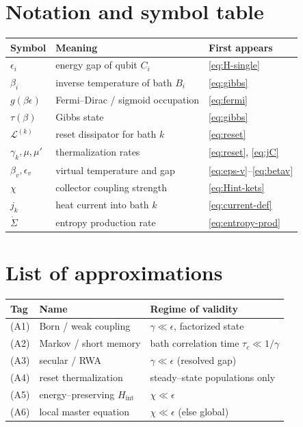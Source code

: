 \documentclass[11pt,a4paper]{article}
\newcommand{\calL}{\mathcal{L}}
\theoremstyle{definition}
\theoremstyle{remark}
\begin{document}
\section{Notation and symbol table}
\label{app:notation}
\begin{center}
\begin{tabularx}{\textwidth}{@{}llX@{}}
\toprule
Symbol & Meaning & First appears \\
\midrule
$\epsilon_i$ & energy gap of qubit $C_i$ & \eqref{eq:H-single} \\
$\beta_i$ & inverse temperature of bath $B_i$ & \eqref{eq:gibbs} \\
$g(\beta\epsilon)$ & Fermi--Dirac / sigmoid occupation & \eqref{eq:fermi} \\
$\tau(\beta)$ & Gibbs state & \eqref{eq:gibbs} \\
$\calL^{(k)}$ & reset dissipator for bath $k$ & \eqref{eq:reset} \\
$\gamma_k,\mu,\mu'$ & thermalization rates & \eqref{eq:reset}, \eqref{eq:jC} \\
$\beta_v,\epsilon_v$ & virtual temperature and gap & \eqref{eq:eps-v}--\eqref{eq:betav} \\
$\chi$ & collector coupling strength & \eqref{eq:Hint-kets} \\
$j_k$ & heat current into bath $k$ & \eqref{eq:current-def} \\
$\dot\Sigma$ & entropy production rate & \eqref{eq:entropy-prod} \\
\bottomrule
\end{tabularx}
\end{center}

\section{List of approximations}
\label{app:approx}
\begin{center}
\begin{tabularx}{\textwidth}{@{}llX@{}}
\toprule
Tag & Name & Regime of validity \\
\midrule
(A1) & Born / weak coupling & $\gamma\ll\epsilon$, factorized state \\
(A2) & Markov / short memory & bath correlation time $\tau_c\ll1/\gamma$ \\
(A3) & secular / RWA & $\gamma\ll\epsilon$ (resolved gap) \\
(A4) & reset thermalization & steady--state populations only \\
(A5) & energy--preserving $H_{\mathrm{int}}$ & $\chi\ll\epsilon$ \\
(A6) & local master equation & $\chi\ll\epsilon$ (else global) \\
\bottomrule
\end{tabularx}
\end{center}
\end{document}
